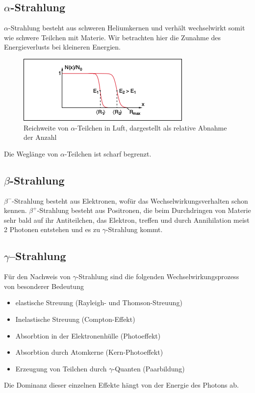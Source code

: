 \documentclass[Ex4_Zusammenfassung.tex]{subfiles}
\begin{document}
\subsection{$\alpha$-Strahlung}
$\alpha$-Strahlung besteht aus schweren Heliumkernen und verhält wechselwirkt somit wie schwere Teilchen mit Materie. Wir betrachten hier die Zunahme des Energieverlusts bei kleineren Energien.

\begin{figure}[h]
\includegraphics{alpha-Strahlung_Reichweite.png}
\caption{Reichweite von $\alpha$-Teilchen in Luft, dargestellt als relative Abnahme der Anzahl}
\end{figure}

Die Weglänge von $\alpha$-Teilchen ist scharf begrenzt.

\subsection{$\beta$-Strahlung}
$\beta^-$-Strahlung besteht aus Elektronen, wofür das Wechselwirkungsverhalten schon kennen. \newline
$\beta^+$-Strahlung besteht aus Positronen, die beim Durchdringen von Materie sehr bald auf ihr Antiteilchen, das Elektron, treffen und durch Annihilation meist 2 Photonen entstehen und es zu $\gamma$-Strahlung kommt.
\newpage
\subsection{$\gamma$--Strahlung}
Für den Nachweis von $\gamma$-Strahlung sind die folgenden Wechselwirkungsprozess von besonderer Bedeutung
\begin{itemize}
\item elastische Streuung (Rayleigh- und Thomson-Streuung)
\item Inelastische Streuung (Compton-Effekt)
\item Absorbtion in der Elektronenhülle (Photoeffekt)
\item Absorbtion durch Atomkerne (Kern-Photoeffekt)
\item Erzeugung von Teilchen durch $\gamma$-Quanten (Paarbildung)
\end{itemize}
Die Dominanz dieser einzelnen Effekte hängt von der Energie des Photons ab.
\end{document}
